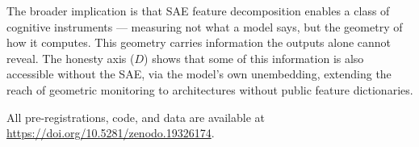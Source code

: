 \documentclass{article}
\begin{document}
The broader implication is that SAE feature decomposition enables a
class of cognitive instruments --- measuring not what a model says,
but the geometry of how it computes. This geometry carries information
the outputs alone cannot reveal. The honesty axis ($D$) shows that
some of this information is also accessible without the SAE, via
the model's own unembedding, extending the reach of geometric
monitoring to architectures without public feature dictionaries.

All pre-registrations, code, and data are available at
\url{https://doi.org/10.5281/zenodo.19326174}.



\end{document}
